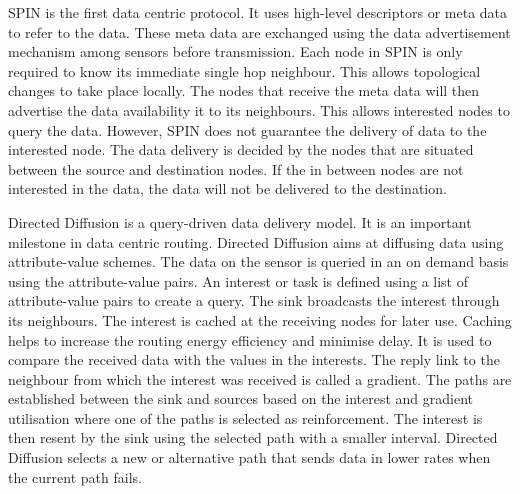 SPIN is the first data centric protocol. It uses high-level descriptors or meta data to refer to the data. These meta data are exchanged using the data advertisement mechanism among sensors before transmission. Each node in SPIN is only required to know its immediate single hop neighbour. This allows topological changes to take place locally. The nodes that receive the meta data will then advertise the data availability it to its neighbours. This allows interested nodes to query the data.
However, SPIN does not guarantee the delivery of data to the interested node. The data delivery is decided by the nodes that are situated between the source and destination nodes. If the in between nodes are not interested in the data, the data will not be delivered to the destination.






Directed Diffusion is a query-driven data delivery model. It is an important milestone in data centric routing. Directed Diffusion aims at diffusing data using attribute-value schemes. The data on the sensor is queried in an on demand basis using the attribute-value pairs. An interest or task is defined using a list of attribute-value pairs to create a query. The sink broadcasts the interest through its neighbours. The interest is cached at the receiving nodes for later use. Caching helps to increase the routing energy efficiency and minimise delay. It is used to compare the received data with the values in the interests. The reply link to the neighbour from which the interest was received is called a gradient. The paths are established between the sink and sources based on the interest and gradient utilisation where one of the paths is selected as reinforcement. The interest is then resent by the sink using the selected path with a smaller interval. Directed Diffusion selects a new or alternative path that sends data in lower rates when the current path fails.

